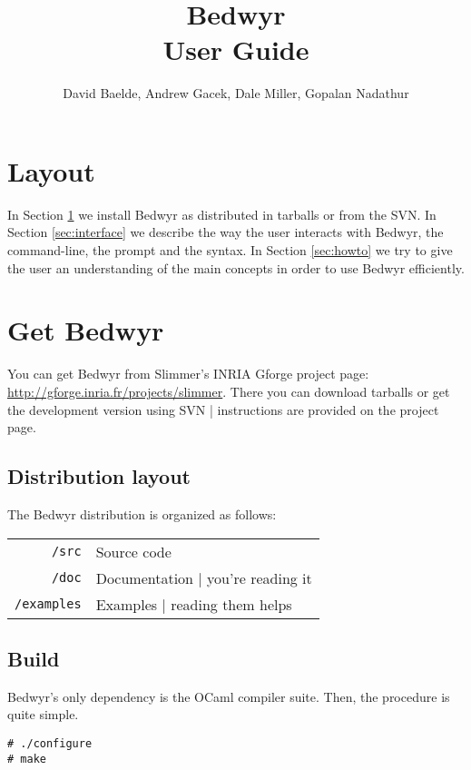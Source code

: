\documentclass{article}
\title{{\Huge Bedwyr} \\ User Guide}
\author{David Baelde, Andrew Gacek, Dale Miller, Gopalan Nadathur}
\begin{document}
\maketitle

\tableofcontents

\section*{Layout}

In Section \ref{sec:install} we install Bedwyr as distributed
in tarballs or from the SVN.
In Section \ref{sec:interface} we describe the way the user interacts with 
Bedwyr, the command-line, the prompt and the syntax.
In Section \ref{sec:howto} we try to give the user an understanding
of the main concepts in order to use Bedwyr efficiently.

\newpage
\section{Get Bedwyr}
\label{sec:install}

You can get Bedwyr from Slimmer's INRIA Gforge project page:
\url{http://gforge.inria.fr/projects/slimmer}.
There you can download tarballs or get the development version using SVN
| instructions are provided on the project page.

\subsection{Distribution layout}

The Bedwyr distribution is organized as follows:

\begin{tabular}{rl}
  \texttt{/src}      & Source code \\
  \texttt{/doc}      &  Documentation | you're reading it \\
  \texttt{/examples} &  Examples | reading them helps
\end{tabular}

\subsection{Build}

Bedwyr's only dependency is the OCaml compiler suite.
Then, the procedure is quite simple.

\begin{verbatim}
# ./configure
# make
\end{verbatim}
\end{document}
